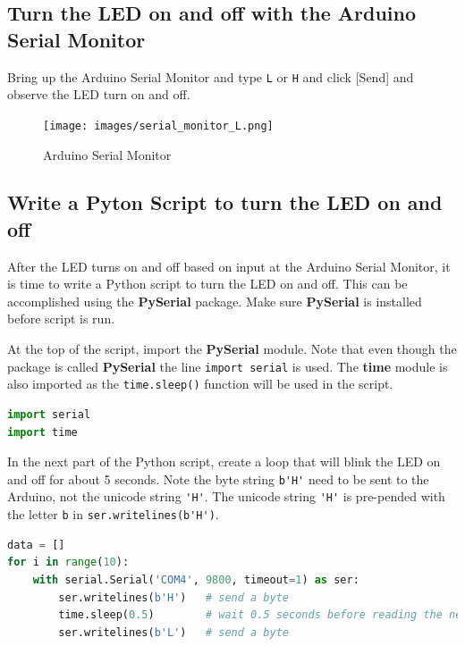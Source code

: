 \documentclass{book}
\begin{document}
    \subsection{Turn the LED on and off with the Arduino Serial
Monitor}\label{turn-the-led-on-and-off-with-the-arduino-serial-monitor}

    Bring up the Arduino Serial Monitor and type \lstinline!L! or
\lstinline!H! and click {[}Send{]} and observe the LED turn on and off.

\begin{figure}
\centering
\texttt{[image: images/serial\_monitor\_L.png]}
\caption{Arduino Serial Monitor}
\end{figure}

    \subsection{Write a Pyton Script to turn the LED on and
off}\label{write-a-pyton-script-to-turn-the-led-on-and-off}

    After the LED turns on and off based on input at the Arduino Serial
Monitor, it is time to write a Python script to turn the LED on and off.
This can be accomplished using the \textbf{PySerial} package. Make sure
\textbf{PySerial} is installed before script is run.

At the top of the script, import the \textbf{PySerial} module. Note that
even though the package is called \textbf{PySerial} the line
\lstinline!import serial! is used. The \textbf{time} module is also
imported as the \lstinline!time.sleep()! function will be used in the
script.

    \begin{lstlisting}[language=Python]
import serial
import time
\end{lstlisting}

    In the next part of the Python script, create a loop that will blink the
LED on and off for about 5 seconds. Note the byte string
\lstinline!b'H'! need to be sent to the Arduino, not the unicode string
\lstinline!'H'!. The unicode string \lstinline!'H'! is pre-pended with
the letter \lstinline!b! in \lstinline!ser.writelines(b'H')!.

    \begin{lstlisting}[language=Python]
data = []
for i in range(10):
    with serial.Serial('COM4', 9800, timeout=1) as ser:
        ser.writelines(b'H')   # send a byte
        time.sleep(0.5)        # wait 0.5 seconds before reading the next line
        ser.writelines(b'L')   # send a byte
\end{lstlisting}
\end{document}
